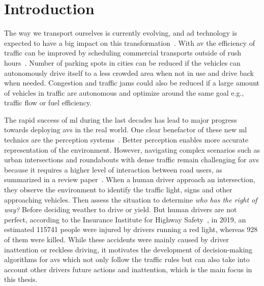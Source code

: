 \chapter{Introduction} \label{ch:intro}
The way we transport ourselves is currently evolving, and \gls{ad} technology is expected to have a big impact on this transformation~\cite{traffic21, McKinsey2023}. With \gls{av} the efficiency of traffic can be improved by scheduling commercial transports outside of rush hours~\cite{FAGNANT2015167}. Number of parking spots in cities can be reduced if the vehicles can autonomously drive itself to a less crowded area when not in use and drive back when needed. Congestion and traffic jams could also be reduced if a large amount of vehicles in traffic are autonomous and optimize around the same goal e.g., traffic flow or fuel efficiency. 

The rapid success of \gls{ml} during the last decades has lead to major progress towards deploying \gls{av}s in the real world. One clear benefactor of these new \gls{ml} technics are the perception systems~\cite{Janai2020}. Better perception enables more accurate representation of the environment. 
However, navigating complex scenarios such as urban intersections and roundabouts with dense traffic remain challenging for \gls{av}s because it requires a higher level of interaction between road users, as summarized in a review paper~\cite{Schwarting2018}. 
When a human driver approach an intersection, they observe the environment to identify the traffic light, signs and other approaching vehicles. Then assess the situation to determine \textit{who has the right of way?} Before deciding weather to drive or yield. 
But human drivers are not perfect, according to the Insurance Institute for Highway Safety~\cite{IIHS2019}, in 2019, an estimated \num{115741} people were injured by drivers running a red light, whereas \num{928} of them were killed. 
While these accidents were mainly caused by driver inattention or reckless driving, it motivates the development of decision-making algorithms for \gls{av}s which not only follow the traffic rules but can also take into account other drivers future actions and inattention, which is the main focus in this thesis. 

